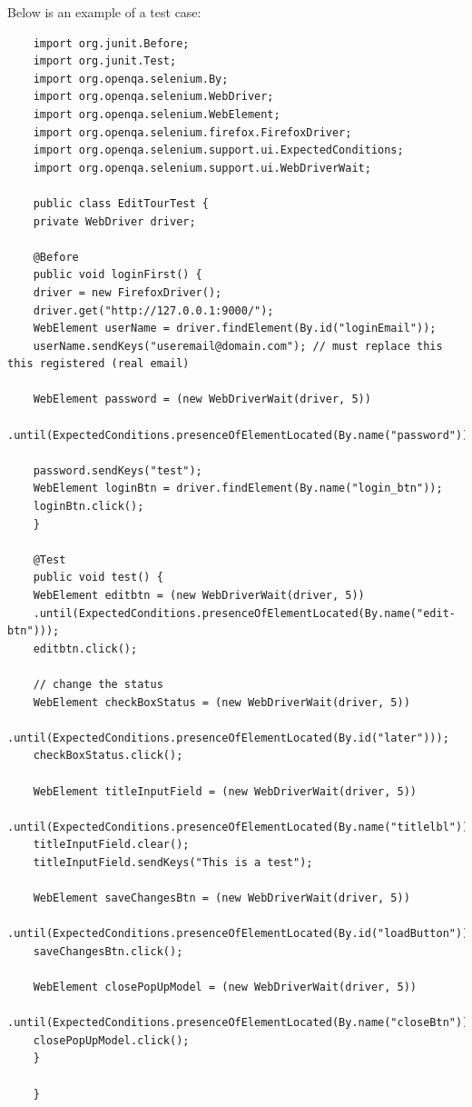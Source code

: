 	Below is an example of a test case:
\begin{verbatim}
	import org.junit.Before;
	import org.junit.Test;
	import org.openqa.selenium.By;
	import org.openqa.selenium.WebDriver;
	import org.openqa.selenium.WebElement;
	import org.openqa.selenium.firefox.FirefoxDriver;
	import org.openqa.selenium.support.ui.ExpectedConditions;
	import org.openqa.selenium.support.ui.WebDriverWait;
	
	public class EditTourTest {
	private WebDriver driver;
	
	@Before
	public void loginFirst() {
	driver = new FirefoxDriver();
	driver.get("http://127.0.0.1:9000/");
	WebElement userName = driver.findElement(By.id("loginEmail"));
	userName.sendKeys("useremail@domain.com"); // must replace this this registered (real email)
	
	WebElement password = (new WebDriverWait(driver, 5))
	.until(ExpectedConditions.presenceOfElementLocated(By.name("password")));
	
	password.sendKeys("test");
	WebElement loginBtn = driver.findElement(By.name("login_btn"));
	loginBtn.click();
	}
	
	@Test
	public void test() {
	WebElement editbtn = (new WebDriverWait(driver, 5))
	.until(ExpectedConditions.presenceOfElementLocated(By.name("edit-btn")));
	editbtn.click();
	
	// change the status
	WebElement checkBoxStatus = (new WebDriverWait(driver, 5))
	.until(ExpectedConditions.presenceOfElementLocated(By.id("later")));
	checkBoxStatus.click();
	
	WebElement titleInputField = (new WebDriverWait(driver, 5))
	.until(ExpectedConditions.presenceOfElementLocated(By.name("titlelbl")));
	titleInputField.clear();
	titleInputField.sendKeys("This is a test");
	
	WebElement saveChangesBtn = (new WebDriverWait(driver, 5))
	.until(ExpectedConditions.presenceOfElementLocated(By.id("loadButton")));
	saveChangesBtn.click();
	
	WebElement closePopUpModel = (new WebDriverWait(driver, 5))
	.until(ExpectedConditions.presenceOfElementLocated(By.name("closeBtn")));
	closePopUpModel.click();
	}
	
	}
\end{verbatim}
	
